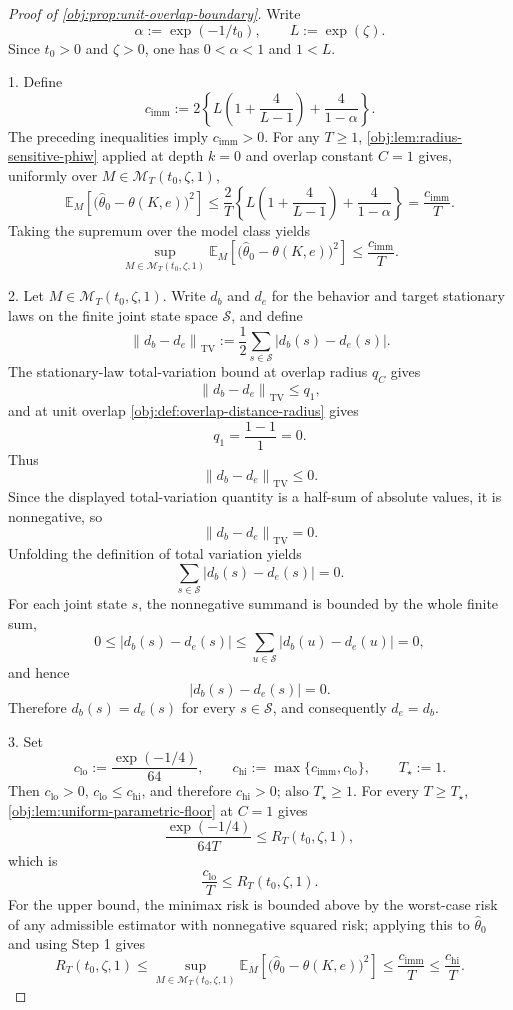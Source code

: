 \begin{proof}[Proof of \cref{obj:prop:unit-overlap-boundary}]
Write
\[
\alpha:=\exp(-1/t_0),
\qquad
L:=\exp(\zeta).
\]
Since \(t_0>0\) and \(\zeta>0\), one has \(0<\alpha<1\) and \(1<L\). %

1. Define
\[
c_{\mathrm{imm}}
:=
2\left\{
L\left(1+\frac{4}{L-1}\right)+\frac{4}{1-\alpha}
\right\}.
\]
The preceding inequalities imply \(c_{\mathrm{imm}}>0\). For any \(T\ge1\), \cref{obj:lem:radius-sensitive-phiw} applied at depth \(k=0\) and overlap constant \(C=1\) gives, uniformly over \(M\in\mathcal M_T(t_0,\zeta,1)\),
\[
\mathbb E_M\!\left[
\bigl(\widehat\theta_0-\theta(K,e)\bigr)^2
\right]
\le
\frac{2}{T}
\left\{
L\left(1+\frac{4}{L-1}\right)+\frac{4}{1-\alpha}
\right\}
=
\frac{c_{\mathrm{imm}}}{T}.
\]
Taking the supremum over the model class yields
\[
\sup_{M\in\mathcal M_T(t_0,\zeta,1)}
\mathbb E_M\!\left[
\bigl(\widehat\theta_0-\theta(K,e)\bigr)^2
\right]
\le
\frac{c_{\mathrm{imm}}}{T}.
\]

2. Let \(M\in\mathcal M_T(t_0,\zeta,1)\). Write \(d_b\) and \(d_e\) for the behavior and target stationary laws on the finite joint state space \(\mathcal S\), and define
\[
\left\|d_b-d_e\right\|_{\mathrm{TV}}
:=
\frac12\sum_{s\in\mathcal S}|d_b(s)-d_e(s)| .
\]
The stationary-law total-variation bound at overlap radius \(q_C\) gives
\[
\left\|d_b-d_e\right\|_{\mathrm{TV}}
\le q_1,
\]
and at unit overlap \cref{obj:def:overlap-distance-radius} gives
\[
q_1=\frac{1-1}{1}=0.
\]
Thus
\[
\left\|d_b-d_e\right\|_{\mathrm{TV}}
\le0.
\]
Since the displayed total-variation quantity is a half-sum of absolute values, it is nonnegative, so
\[
\left\|d_b-d_e\right\|_{\mathrm{TV}}=0.
\]
Unfolding the definition of total variation yields
\[
\sum_{s\in\mathcal S}|d_b(s)-d_e(s)|=0.
\]
For each joint state \(s\), the nonnegative summand is bounded by the whole finite sum,
\[
0\le |d_b(s)-d_e(s)|
\le
\sum_{u\in\mathcal S}|d_b(u)-d_e(u)|
=0,
\]
and hence
\[
|d_b(s)-d_e(s)|=0.
\]
Therefore \(d_b(s)=d_e(s)\) for every \(s\in\mathcal S\), and consequently \(d_e=d_b\). %

3. Set
\[
c_{\mathrm{lo}}:=\frac{\exp(-1/4)}{64},
\qquad
c_{\mathrm{hi}}:=\max\{c_{\mathrm{imm}},c_{\mathrm{lo}}\},
\qquad
T_\star:=1.
\]
Then \(c_{\mathrm{lo}}>0\), \(c_{\mathrm{lo}}\le c_{\mathrm{hi}}\), and therefore \(c_{\mathrm{hi}}>0\); also \(T_\star\ge1\). For every \(T\ge T_\star\), \cref{obj:lem:uniform-parametric-floor} at \(C=1\) gives
\[
\frac{\exp(-1/4)}{64T}
\le
R_T(t_0,\zeta,1),
\]
which is
\[
\frac{c_{\mathrm{lo}}}{T}
\le
R_T(t_0,\zeta,1).
\]
For the upper bound, the minimax risk is bounded above by the worst-case risk of any admissible estimator with nonnegative squared risk; applying this to \(\widehat\theta_0\) and using Step 1 gives
\[
R_T(t_0,\zeta,1)
\le
\sup_{M\in\mathcal M_T(t_0,\zeta,1)}
\mathbb E_M\!\left[
\bigl(\widehat\theta_0-\theta(K,e)\bigr)^2
\right]
\le
\frac{c_{\mathrm{imm}}}{T}
\le
\frac{c_{\mathrm{hi}}}{T}.
\]


\end{proof}

